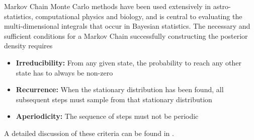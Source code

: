 Markov Chain Monte Carlo methods have been used extensively in astro-statistics, computational physics and biology, and is central to evaluating the multi-dimensional integrals that occur in Bayesian statistics. The necessary and sufficient conditions for a Markov Chain  successfully constructing the posterior density requires
\begin{itemize}
	\item \textbf{Irreducibility:} From any given state, the probability to reach any other state has to always be non-zero
	\item \textbf{Recurrence:} When the stationary distribution has been found, all subsequent steps must sample from that stationary distribution
	\item \textbf{Aperiodicity:} The sequence of steps must not be periodic
\end{itemize}
A detailed discussion of these criteria can be found in \cite{mcmc_practice, mcmc_handbook,mcmc_astro,bayesian_tutorial}.

